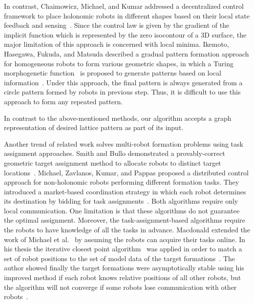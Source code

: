 In contrast, Chaimowicz, Michael, and Kumar addressed a decentralized control
framework to place holonomic robots in different shapes based on their local
state feedback and sensing~\cite{ChaMicKum05}. 
%
Since the control law is given by the gradient of the implicit function which is represented by the zero isocontour of a 3D surface, the major limitation of this approach is concerned with local minima. 
%
Ikemoto, Hasegawa, Fukuda, and Matsuda described a gradual pattern formation approach for homogeneous robots to form various geometric shapes, in which a Turing morphogenetic function~\cite{Turing37} is proposed to generate patterns based on local information~\cite{IkeHasFukMat05}. 
%
Under this approach, the final pattern is always generated from a circle pattern formed by robots in
previous step. Thus, it is difficult to use this approach to form any repeated
pattern.


In contrast to the above-mentioned methods, our algorithm accepts a graph
representation of desired lattice pattern as part of its input.


Another trend of related work solves multi-robot formation problems using task
assignment approaches. 
%
Smith and Bullo demonstrated a provably-correct geometric target assignment method to allocate robots to distinct target locations~\cite{SmiBul07}.  
%
Michael, Zavlanos, Kumar, and Pappas proposed a distributed control approach for non-holonomic robots performing different formation tasks.  
%
They introduced a market-based coordination strategy in which each robot determines its destination by bidding for task assignments~\cite{MicZavKumPap08}.  
%
Both algorithms require only local communication. 
%
One limitation is that these algorithms do not guarantee the optimal assignment. 
%
Moreover, the task-assignment-based algorithms require the robots to have knowledge of all the tasks in advance.  
%
Macdonald extended the work of Michael et al.~\cite{MicZavKumPap08} by assuming the robots can acquire their
tasks online.  
%
In his thesis the iterative closest point algorithm~\cite{RusLev01} was applied in order to match a set of
robot positions to the set of model data of the target formations~\cite{Mac11}.  
%
The author showed finally the target formations were asymptotically stable using his improved method if each robot knows relative positions of all other robots, but the algorithm will not converge if
some robots lose communication with other robots~\cite{Mac11}.


